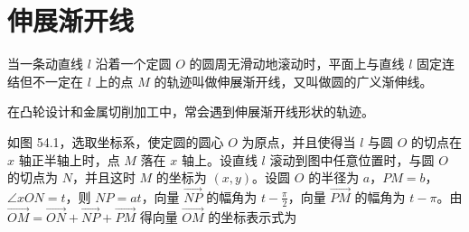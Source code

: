 \section{伸展渐开线}

当一条动直线 $l$ 沿着一个定圆 $O$ 的圆周无滑动地滚动时，平面上与直线 $l$ 固定连结但不一定在 $l$ 上的点 $M$ 的轨迹叫做伸展渐开线，又叫做圆的广义渐伸线。

在凸轮设计和金属切削加工中，常会遇到伸展渐开线形状的轨迹。

\noindent
\begin{minipage}[c]{0.53\textwidth}
  \hspace*{2em}如图 54.1，选取坐标系，使定圆的圆心 $O$ 为原点，并且使得当 $l$ 与圆 $O$ 的切点在 $x$ 轴正半轴上时，点 $M$ 落在 $x$ 轴上。设直线 $l$ 滚动到图中任意位置时，与圆 $O$ 的切点为 $N$，并且这时 $M$ 的坐标为 $(x,y)$。设圆 $O$ 的半径为 $a$，$PM = b$，$\angle xON = t$，则 $NP = at$，向量 $\overrightarrow{NP}$ 的幅角为 $t - \frac{\pi}{2}$，向量 $\overrightarrow{PM}$ 的幅角为 $t - \pi$。由 $\overrightarrow{OM} = \overrightarrow{ON} + \overrightarrow{NP} + \overrightarrow{PM}$ 得向量 $\overrightarrow{OM}$ 的坐标表示式为
\end{minipage}\hfill
